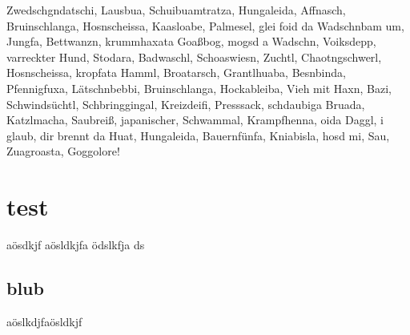 \documentclass[ngerman,titlepage]{scrreprt}
\begin{document}
  Zwedschgndatschi, Lausbua, Schuibuamtratza, Hungaleida, Affnasch, Bruinschlanga, Hosnscheissa, Kaasloabe, Palmesel, glei foid da Wadschnbam um, Jungfa, Bettwanzn, krummhaxata Goaßbog, mogsd a Wadschn, Voiksdepp, varreckter Hund, Stodara, Badwaschl, Schoaswiesn, Zuchtl, Chaotngschwerl, Hosnscheissa, kropfata Hamml, Broatarsch, Grantlhuaba, Besnbinda, Pfennigfuxa, Lätschnbebbi, Bruinschlanga, Hockableiba, Vieh mit Haxn, Bazi, Schwindsüchtl, Schbringgingal, Kreizdeifi, Presssack, schdaubiga Bruada, Katzlmacha, Saubreiß, japanischer, Schwammal, Krampfhenna, oida Daggl, i glaub, dir brennt da Huat, Hungaleida, Bauernfünfa, Kniabisla, hosd mi, Sau, Zuagroasta, Goggolore!
  \section{test}
  aösdkjf aösldkjfa ödslkfja ds
  \subsection{blub}
  aöslkdjfaösldkjf
  
\end{document}
